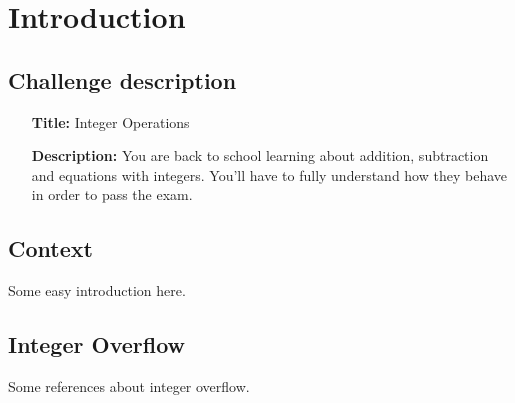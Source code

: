\chapter{Introduction}
\section{Challenge description}
\begin{itemize}
	\item[\textbf{Title:}]{Integer Operations}
	\item[\textbf{Description:}]{You are back to school learning about addition, subtraction and equations with integers. You'll have to fully understand how they behave in order to pass the exam.}
\end{itemize}
\section{Context}


Some  easy introduction here.

\section{Integer Overflow}

Some references about integer overflow. 
